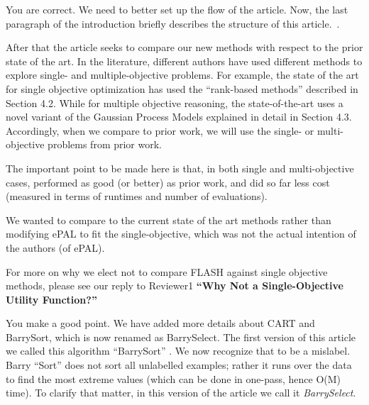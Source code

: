 You are correct. We need to better set up the flow of the article. Now,  the last paragraph of the introduction briefly describes the structure of this article.~.

After that the article seeks to compare our new methods with respect to the prior state of the art. In the literature, different authors have used different methods to explore single- and multiple-objective problems. For example, 
the state of the art for single objective optimization has used the “rank-based methods” described in Section 4.2.
While for multiple objective reasoning, the state-of-the-art uses a novel variant of the Gaussian Process Models explained in detail  in Section 4.3.
Accordingly, when we compare \flash to prior work, we will use the   single- or  multi-objective problems from prior work. 

The important point to be made here is that, in both single and multi-objective cases, \flash performed as good (or better) as prior work, and did so far less cost (measured in terms of runtimes and number of evaluations).
 
 
 
 We wanted to compare \flash to the current state of the art methods rather than modifying ePAL to fit the single-objective, which was not the actual intention of the authors (of ePAL).
 
 For more on why we elect not to compare FLASH against single objective
 methods, please see our reply to Reviewer1 
 {\bf ``Why Not a Single-Objective Utility Function?''}
 


You make a good point. We have added more details about CART and BarrySort, which is now renamed as BarrySelect. The  first version of this article we called this algorithm ``BarrySort'' . We now recognize that to be  a mislabel. Barry ``Sort'' does not sort all unlabelled examples; rather it runs over the data to find the most extreme values (which can be done in one-pass, hence O(M) time). To clarify that matter, in  this version of the article we call it \textit{BarrySelect}. 


